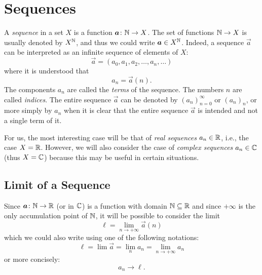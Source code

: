 \section{Sequences}
\label{sec:successioni}

A \emph{sequence}%
%
 in a set $X$ is a function $\boldsymbol a\colon {\mathbb N} \to X$.
The set of functions ${\mathbb N} \to X$ is usually denoted by $X^{\mathbb N}$, and thus we
could write $\boldsymbol a \in X^{\mathbb N}$.
Indeed, a sequence $\vec a$ can be interpreted as an infinite sequence of
elements of $X$:
\[
  \vec a = (a_0, a_1, a_2, \dots, a_n, \dots )
\]
where it is understood that
\[
   a_n = \vec a(n).
\]
The components $a_n$ are called the \emph{terms} of the sequence.
The numbers $n$ are called \emph{indices}.
The entire sequence $\vec a$ can be denoted by $(a_n)_{n=0}^\infty$ or
$(a_n)_n$, or more simply by $a_n$ when it is clear that the entire sequence
$\vec a$ is intended and not a single term of it.%

For us, the most interesting case will be that of \emph{real sequences} $a_n\in
{\mathbb R}$, i.e., the case $X={\mathbb R}$. However, we will also consider the case of
\emph{complex sequences} $a_n\in {\mathbb C}$ (thus $X={\mathbb C}$) because this may be useful
in certain situations.%

\subsection{Limit of a Sequence}

Since $\boldsymbol a \colon {\mathbb N}\to{\mathbb R}$ (or in ${\mathbb C}$) is a function with domain
${\mathbb N}\subseteq {\mathbb R}$ and since $+\infty$ is the only accumulation point of ${\mathbb N}$, it
will be possible to consider the limit
\[
  \ell = \lim_{n\to +\infty} \vec a(n)
\]
which we could also write using one of the following notations:
\[
\ell = \lim \vec a = \lim_n a_n = \lim_{n\to +\infty} a_n
\]
or more concisely:
\[
  a_n \to \ell. 
\]

